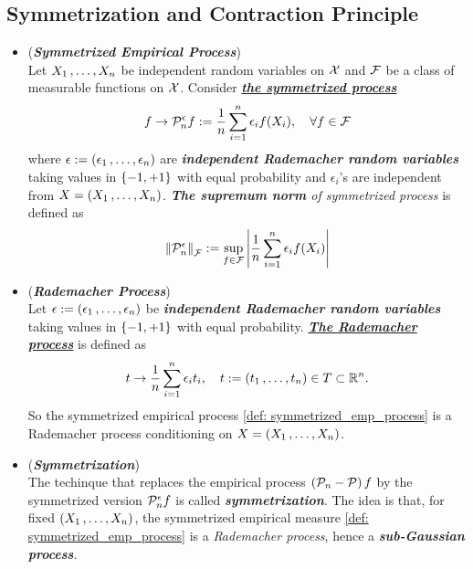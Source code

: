 \documentclass[11pt]{article}
\begin{document}
\subsection{Symmetrization and Contraction Principle}
\begin{itemize}
\item \begin{definition}(\emph{\textbf{Symmetrized Empirical Process}})\\
Let $X_1 \,{,}\ldots{,}\, X_n$ be independent random variables on ${\mathcal X}$ and ${\mathcal F}$ be a class of measurable functions on ${\mathcal X}$. Consider \underline{\emph{\textbf{the symmetrized process}}}
\begin{align}
f \to {\mathcal P}_n^{\epsilon}f := \frac{1}{n}\sum_{i=1}^{n}\epsilon_i f(X_i),  \quad  \forall f \in {\mathcal F}\label{def: symmetrized_emp_process}
\end{align} where $\epsilon := (\epsilon_1 \,{,}\ldots{,}\, \epsilon_n)$ are  \textbf{\emph{independent Rademacher random variables}} taking values in $\left\{-1, +1\right\}$ with equal probability and $\epsilon_i$'s are independent from $X  = (X_1 \,{,}\ldots{,}\, X_n)$. \emph{\textbf{The supremum norm} of symmetrized process} is defined as
\begin{align*}
\left\|{\mathcal P}_n^{\epsilon}\right\|_{{\mathcal F}} := \sup_{f \in {\mathcal F}}\left\lvert \frac{1}{n}\sum_{i=1}^{n}\epsilon_i f(X_i) \right\rvert
\end{align*}
\end{definition}

\item \begin{definition}(\emph{\textbf{Rademacher Process}})\\
Let $\epsilon := (\epsilon_1 \,{,}\ldots{,}\, \epsilon_n)$ be  \textbf{\emph{independent Rademacher random variables}} taking values in $\left\{-1, +1\right\}$ with equal probability. \underline{\emph{\textbf{The Rademacher process}}} is defined as 
\begin{align}
t \to \frac{1}{n}\sum_{i=1}^{n}\epsilon_i  t_i, \quad t := (t_1 \,{,}\ldots{,}\, t_n) \in T \subset {\mathbb R}^n. \label{def: Rademacher_emp_process}
\end{align} So the symmetrized empirical process \eqref{def: symmetrized_emp_process} is a Rademacher process conditioning on $X = (X_1 \,{,}\ldots{,}\, X_n)$.
\end{definition}

\item \begin{remark}(\textbf{\emph{Symmetrization}}) \\
The techinque that replaces the empirical process $\left({\mathcal P}_n - {\mathcal P}\right)f$ by the symmetrized version ${\mathcal P}_n^{\epsilon}f $  is called \emph{\textbf{symmetrization}}. The idea is that, for fixed $(X_1 \,{,}\ldots{,}\, X_n)$, the symmetrized empirical measure \eqref{def: symmetrized_emp_process} is a \emph{Rademacher process}, hence a \emph{\textbf{sub-Gaussian process}}.
\end{remark}


\end{itemize}
\end{document}
